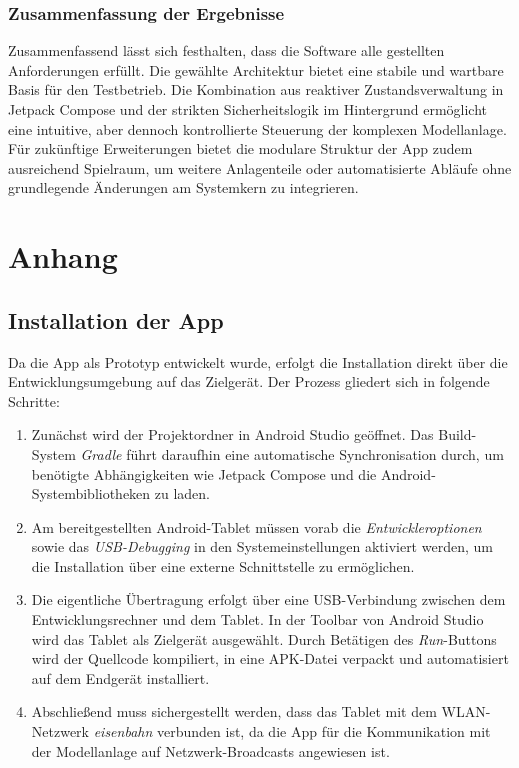 \documentclass{article}
\begin{document}
\subsubsection{Zusammenfassung der Ergebnisse}
Zusammenfassend lässt sich festhalten, dass die Software alle gestellten Anforderungen erfüllt.
Die gewählte Architektur bietet eine stabile und wartbare Basis für den Testbetrieb.
Die Kombination aus reaktiver Zustandsverwaltung in Jetpack Compose und der strikten Sicherheitslogik im Hintergrund ermöglicht eine intuitive, aber dennoch kontrollierte Steuerung der komplexen Modellanlage.
Für zukünftige Erweiterungen bietet die modulare Struktur der App zudem ausreichend Spielraum, um weitere Anlagenteile oder automatisierte Abläufe ohne grundlegende Änderungen am Systemkern zu integrieren.



\section{Anhang}
\subsection{Installation der App}
Da die App als Prototyp entwickelt wurde, erfolgt die Installation direkt über die Entwicklungsumgebung auf das Zielgerät. Der Prozess gliedert sich in folgende Schritte:

\begin{enumerate}
    \item Zunächst wird der Projektordner in Android Studio geöffnet. Das Build-System \textit{Gradle} führt daraufhin eine automatische Synchronisation durch, um benötigte Abhängigkeiten wie Jetpack Compose und die Android-Systembibliotheken zu laden.

    \item Am bereitgestellten Android-Tablet müssen vorab die \textit{Entwickleroptionen} sowie das \textit{USB-Debugging} in den Systemeinstellungen aktiviert werden, um die Installation über eine externe Schnittstelle zu ermöglichen.

    \item Die eigentliche Übertragung erfolgt über eine USB-Verbindung zwischen dem Entwicklungsrechner und dem Tablet. In der Toolbar von Android Studio wird das Tablet als Zielgerät ausgewählt. Durch Betätigen des \textit{Run}-Buttons wird der Quellcode kompiliert, in eine APK-Datei verpackt und automatisiert auf dem Endgerät installiert.

    \item Abschließend muss sichergestellt werden, dass das Tablet mit dem WLAN-Netzwerk \textit{eisenbahn} verbunden ist, da die App für die Kommunikation mit der Modellanlage auf Netzwerk-Broadcasts angewiesen ist.
\end{enumerate}
\end{document}
